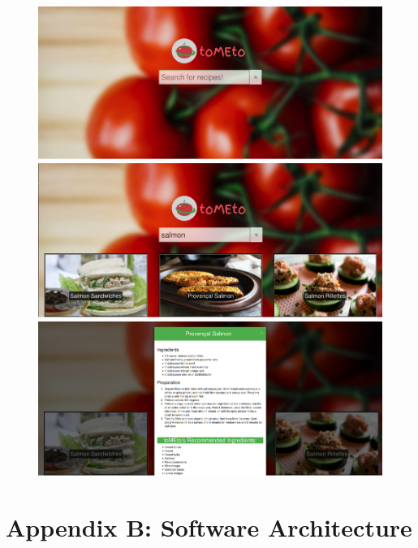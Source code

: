\documentclass{acm_proc_article-sp}
\begin{document}
\begin{figure}[H]
\centering
\includegraphics[width=.95\textwidth]{p1.png}
\includegraphics[width=.95\textwidth]{p2.png}
\includegraphics[width=.95\textwidth]{p3.png}
\end{figure}

\clearpage
\onecolumn
\section*{Appendix B: Software Architecture}
\vspace{3mm} %
\end{document}
